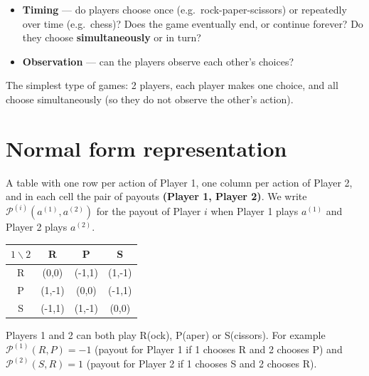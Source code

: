 \documentclass[11pt,a4paper,openany]{book}
\begin{document}
\begin{propbox}[title=What distinguishes types of games]
\begin{itemize}
  \item \textbf{Timing} --- do players choose once (e.g.\ rock-paper-scissors) or repeatedly
        over time (e.g.\ chess)? Does the game eventually end, or continue forever? Do they
        choose \textbf{simultaneously} or in turn?
  \item \textbf{Observation} --- can the players observe each other's choices?
\end{itemize}
\end{propbox}

\begin{rembox}[title=Lecture 1 setting]
The simplest type of games: 2 players, each player makes one choice, and all choose
simultaneously (so they do not observe the other's action).
\end{rembox}


\section{Normal form representation}

\begin{defnbox}[title=Normal form]
A table with one row per action of Player 1, one column per action of Player 2, and in each
cell the pair of payouts \textbf{(Player 1, Player 2)}. We write
$\mathcal{P}^{(i)}(a^{(1)}, a^{(2)})$ for the payout of Player $i$ when Player 1 plays
$a^{(1)}$ and Player 2 plays $a^{(2)}$.
\end{defnbox}

\begin{exbox}[title=Rock-Paper-Scissors]
\begin{center}
\begin{tabular}{c|ccc}
$1 \backslash 2$ & R & P & S \\ \hline
R & (0,0)  & (-1,1) & (1,-1) \\
P & (1,-1) & (0,0)  & (-1,1) \\
S & (-1,1) & (1,-1) & (0,0)
\end{tabular}
\end{center}
Players 1 and 2 can both play R(ock), P(aper) or S(cissors). For example
$\mathcal{P}^{(1)}(R,P) = -1$ (payout for Player 1 if 1 chooses R and 2 chooses P) and
$\mathcal{P}^{(2)}(S,R) = 1$ (payout for Player 2 if 1 chooses S and 2 chooses R).
\end{exbox}
\end{document}

